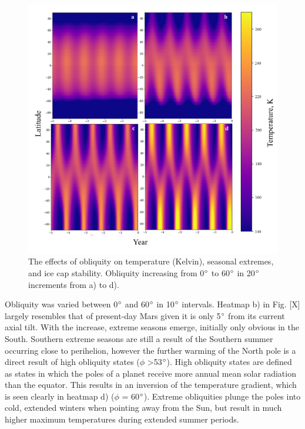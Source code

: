 \documentclass[12pt,onecolumn]{revtex4-2}    %
\begin{document}
\begin{figure}[H]
\centering
\includegraphics[width = 17cm]{obliquity_heatmaps_new.png}
\caption{The effects of obliquity on temperature (Kelvin), seasonal extremes, and ice cap stability. Obliquity increasing from 0$\degree$ to 60$\degree$ in 20$\degree$ increments from a) to d).}
\label{fig:test}
\end{figure}

Obliquity was varied between 0$\degree$ and 60$\degree$ in 10$\degree$ intervals. Heatmap b) in Fig. [X] largely resembles that of present-day Mars given it is only 5$\degree$ from its current axial tilt. With the increase, extreme seasons emerge, initially only obvious in the South. Southern extreme seasons are still a result of the Southern summer occurring close to perihelion, however the further warming of the North pole is a direct result of high obliquity states ($\phi$ \textgreater 53$\degree$). High obliquity states are defined as states in which the poles of a planet receive more annual mean solar radiation than the equator. This results in an inversion of the temperature gradient, which is seen clearly in heatmap d) ($\phi$ = 60$\degree$). Extreme obliquities plunge the poles into cold, extended winters when pointing away from the Sun, but result in much higher maximum temperatures during extended summer periods.
\\
\end{document}

